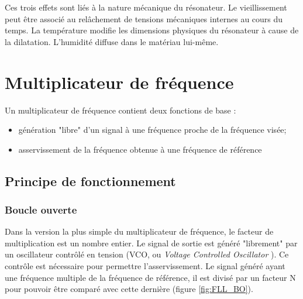 Ces trois effets sont liés à la nature mécanique du résonateur. Le vieillissement peut être associé au relâchement de tensions mécaniques internes au cours du temps. La température modifie les dimensions physiques du résonateur à cause de la dilatation. L'humidité diffuse dans le matériau lui-même.

\section{Multiplicateur de fréquence}
Un multiplicateur de fréquence contient deux fonctions de base :
\begin{itemize}[label=\textbullet,font=\small]
\item génération "libre" d'un signal à une fréquence proche de la fréquence visée;
\item asservissement de la fréquence obtenue à une fréquence de référence
\end{itemize}

\subsection{Principe de fonctionnement} 
\subsubsection*{Boucle ouverte}
Dans la version la plus simple du multiplicateur de fréquence, le facteur de multiplication est un nombre entier. Le signal de sortie est généré "librement" par un oscillateur contrôlé en tension (VCO, ou \textit{Voltage Controlled Oscillator }). Ce contrôle est nécessaire pour permettre l'asservissement. 
Le signal généré ayant une fréquence multiple de la fréquence de référence, il est divisé par un facteur N pour pouvoir être comparé avec cette dernière (figure \ref{fig:FLL_BO}).

